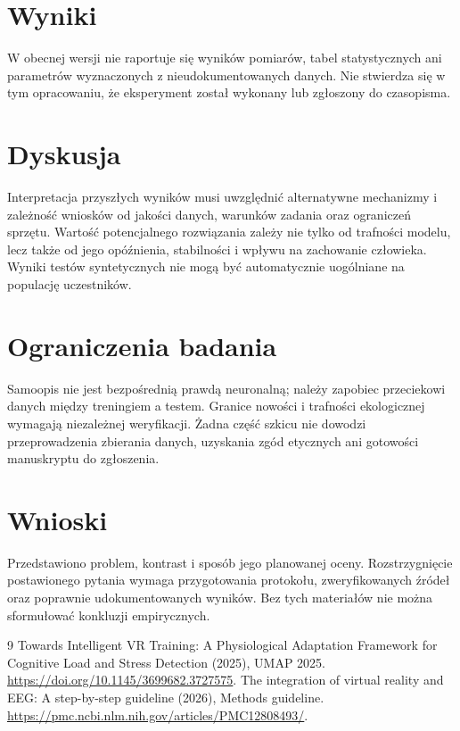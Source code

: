 \documentclass[11pt,a4paper]{article}
\begin{document}
\section{Wyniki}

W obecnej wersji nie raportuje się wyników pomiarów, tabel statystycznych ani parametrów wyznaczonych z nieudokumentowanych danych. Nie stwierdza się w tym opracowaniu, że eksperyment został wykonany lub zgłoszony do czasopisma.

\section{Dyskusja}

Interpretacja przyszłych wyników musi uwzględnić alternatywne mechanizmy i zależność wniosków od jakości danych, warunków zadania oraz ograniczeń sprzętu. Wartość potencjalnego rozwiązania zależy nie tylko od trafności modelu, lecz także od jego opóźnienia, stabilności i wpływu na zachowanie człowieka. Wyniki testów syntetycznych nie mogą być automatycznie uogólniane na populację uczestników.

\section{Ograniczenia badania}

Samoopis nie jest bezpośrednią prawdą neuronalną; należy zapobiec przeciekowi danych między treningiem a testem. Granice nowości i trafności ekologicznej wymagają niezależnej weryfikacji. Żadna część szkicu nie dowodzi przeprowadzenia zbierania danych, uzyskania zgód etycznych ani gotowości manuskryptu do zgłoszenia.

\section{Wnioski}

Przedstawiono problem, kontrast i sposób jego planowanej oceny. Rozstrzygnięcie postawionego pytania wymaga przygotowania protokołu, zweryfikowanych źródeł oraz poprawnie udokumentowanych wyników. Bez tych materiałów nie można sformułować konkluzji empirycznych.

\begin{thebibliography}{9}
 Towards Intelligent VR Training: A Physiological Adaptation Framework for Cognitive Load and Stress Detection (2025), UMAP 2025. \url{https://doi.org/10.1145/3699682.3727575}.
 The integration of virtual reality and EEG: A step-by-step guideline (2026), Methods guideline. \url{https://pmc.ncbi.nlm.nih.gov/articles/PMC12808493/}.
\end{thebibliography}
\end{document}
